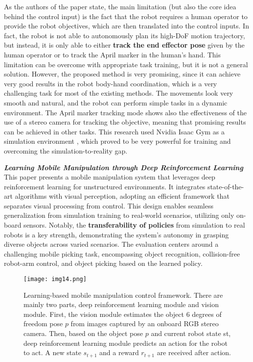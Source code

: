 As the authors of the paper \cite{fu2022deeplegged} state, the main limitation (but also the core idea
behind the control input) is the fact that the robot requires a human operator to
provide the robot objectives, which are then translated into the control inputs. In fact,
the robot is not able to autonomously plan its high-DoF motion trajectory, but instead,
it is only able to either \textbf{track the end effector pose} given by the human operator or
to track the April marker in the human's hand.
This limitation can be overcome with appropriate task training, but it is not a general solution.
However, the proposed method is very promising, since it can achieve very good results
in the robot body-hand coordination, which is a very challenging task for most of the existing
methods. The movements look very smooth and natural, and the robot can perform
simple tasks in a dynamic environment. The April marker tracking mode shows also the effectiveness of
the use of a stereo camera for tracking the objective, meaning that promising results can be
achieved in other tasks. This research used Nvidia Isaac Gym \cite{isaacgym} as a simulation environment
\cite{isaacsim}, which proved to be very powerful for training and overcoming the simulation-to-reality gap.

\textbf{\textit{Learning Mobile Manipulation through Deep
		Reinforcement Learning}} \quad
\cite{wang2020drlmanipulation}
This paper presents a mobile manipulation system that leverages deep
reinforcement learning for unstructured environments. It integrates state-of-the-art
algorithms with visual perception, adopting an efficient framework that separates
visual processing from control. This design enables seamless generalization from simulation
training to real-world scenarios, utilizing only on-board sensors.
Notably, the \textbf{transferability of policies} from simulation to real robots is a key strength,
demonstrating the system's autonomy in grasping diverse objects across varied scenarios.
The evaluation centers around a challenging mobile picking task, encompassing object recognition,
collision-free robot-arm control, and object picking based on the learned policy.


\begin{figure}[t]
	\centering
	\texttt{[image: img14.png]}
	\captionsetup{width=1\linewidth}
	\caption{Learning-based mobile manipulation control framework. There are mainly two parts,
		deep reinforcement learning module and vision module. First, the vision module estimates
		the object 6 degrees of freedom pose $p$ from images captured by an onboard RGB stereo camera.
		Then, based on the object pose $p$ and current robot state st, deep reinforcement learning
		module predicts an action for the robot to act. A new state $s_{t+1}$ and a reward
		$r_{t+1}$ are received after action.\cite{wang2020drlmanipulation}}
	\label{fig:img14}
\end{figure}

